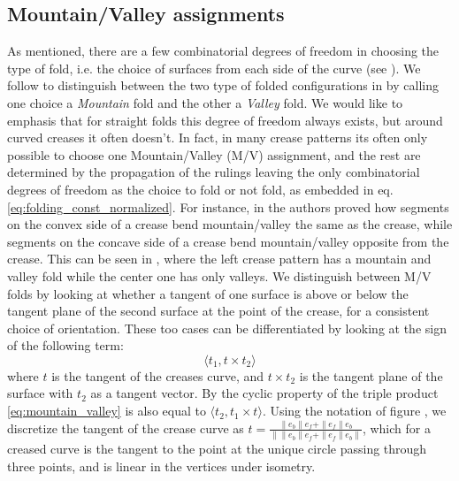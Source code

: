 \subsection{Mountain/Valley assignments} As mentioned, there are a few combinatorial degrees of freedom in choosing the type of fold, i.e. the choice of surfaces from each side of the curve (see ). We follow \cite{demaine_lens} to distinguish between the two type of folded configurations in  by calling one choice a \textit{Mountain} fold and the other a \textit{Valley} fold. We would like to emphasis that for straight folds this degree of freedom always exists, but around curved creases it often doesn't. In fact, in many crease patterns its often only possible to choose  one Mountain/Valley (M/V) assignment, and the rest are determined by the propagation of the rulings leaving the only combinatorial degrees of freedom  as the choice to fold or not fold, as embedded in eq. \eqref{eq:folding_const_normalized}. For instance, in \cite{demaine_lens} the authors proved how segments on the convex side of a crease  bend mountain/valley the same as the crease, while segments on the concave side of a crease bend mountain/valley opposite from the crease. This can be seen in , where the left crease pattern has a mountain and valley fold while the center one has only valleys.
  We distinguish between M/V folds by looking at whether a tangent of one surface is above or below the tangent plane of the second surface at the point of the crease, for a consistent choice of orientation. These too cases can be differentiated by looking at the sign of the following term:
\begin{equation} \label{eq:mountain_valley}
\langle t_1, t \times t_2 \rangle 
\end{equation}
where $t$ is the tangent of the creases curve, and $t \times t_2$ is the tangent plane of the surface with $t_2$ as a tangent vector. By the cyclic property of the triple product \eqref{eq:mountain_valley} is also equal to $\langle t_2, t_1 \times t \rangle$.
Using the notation of figure , we discretize the tangent of the crease curve as $t = \frac{\|e_b\|e_f + \|e_f\|e_b}{\|\|e_b\|e_f + \|e_f\|e_b\|}$, which for a creased curve is the tangent to the point at the unique circle passing through three points, and is linear in the vertices under isometry. 
